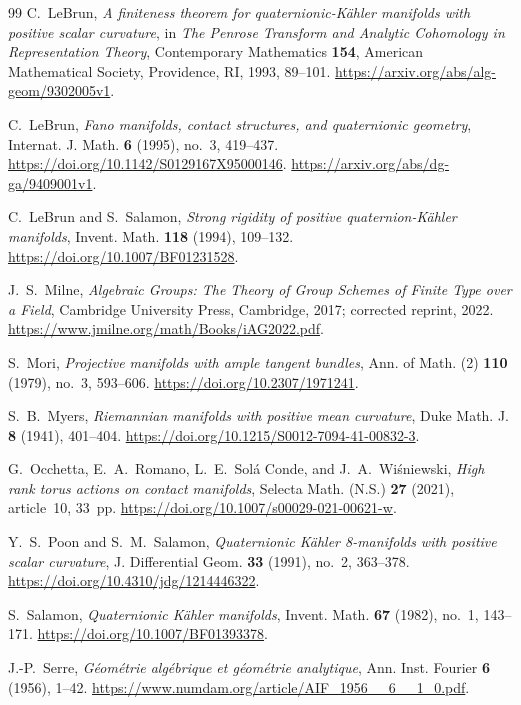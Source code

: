 \begin{thebibliography}{99}
C.~LeBrun,
\emph{A finiteness theorem for quaternionic-K\"ahler manifolds with
positive scalar curvature},
in \emph{The Penrose Transform and Analytic Cohomology in Representation Theory},
Contemporary Mathematics \textbf{154}, American Mathematical Society,
Providence, RI, 1993, 89--101.
\url{https://arxiv.org/abs/alg-geom/9302005v1}.

C.~LeBrun,
\emph{Fano manifolds, contact structures, and quaternionic geometry},
Internat. J. Math. \textbf{6} (1995), no.~3, 419--437.
\url{https://doi.org/10.1142/S0129167X95000146}.
\url{https://arxiv.org/abs/dg-ga/9409001v1}.

C.~LeBrun and S.~Salamon,
\emph{Strong rigidity of positive quaternion-K\"ahler manifolds},
Invent. Math. \textbf{118} (1994), 109--132.
\url{https://doi.org/10.1007/BF01231528}.

J.~S.~Milne,
\emph{Algebraic Groups: The Theory of Group Schemes of Finite Type over a Field},
Cambridge University Press, Cambridge, 2017; corrected reprint, 2022.
\url{https://www.jmilne.org/math/Books/iAG2022.pdf}.

S.~Mori,
\emph{Projective manifolds with ample tangent bundles},
Ann. of Math. (2) \textbf{110} (1979), no.~3, 593--606.
\url{https://doi.org/10.2307/1971241}.

S.~B.~Myers,
\emph{Riemannian manifolds with positive mean curvature},
Duke Math. J. \textbf{8} (1941), 401--404.
\url{https://doi.org/10.1215/S0012-7094-41-00832-3}.

G.~Occhetta, E.~A.~Romano, L.~E.~Sol\'a Conde, and J.~A.~Wi\'sniewski,
\emph{High rank torus actions on contact manifolds},
Selecta Math. (N.S.) \textbf{27} (2021), article~10, 33~pp.
\url{https://doi.org/10.1007/s00029-021-00621-w}.

Y.~S.~Poon and S.~M.~Salamon,
\emph{Quaternionic K\"ahler 8-manifolds with positive scalar curvature},
J. Differential Geom. \textbf{33} (1991), no.~2, 363--378.
\url{https://doi.org/10.4310/jdg/1214446322}.

S.~Salamon,
\emph{Quaternionic K\"ahler manifolds},
Invent. Math. \textbf{67} (1982), no.~1, 143--171.
\url{https://doi.org/10.1007/BF01393378}.

J.-P.~Serre,
\emph{G\'eom\'etrie alg\'ebrique et g\'eom\'etrie analytique},
Ann. Inst. Fourier \textbf{6} (1956), 1--42.
\url{https://www.numdam.org/article/AIF_1956__6__1_0.pdf}.


\end{thebibliography}
